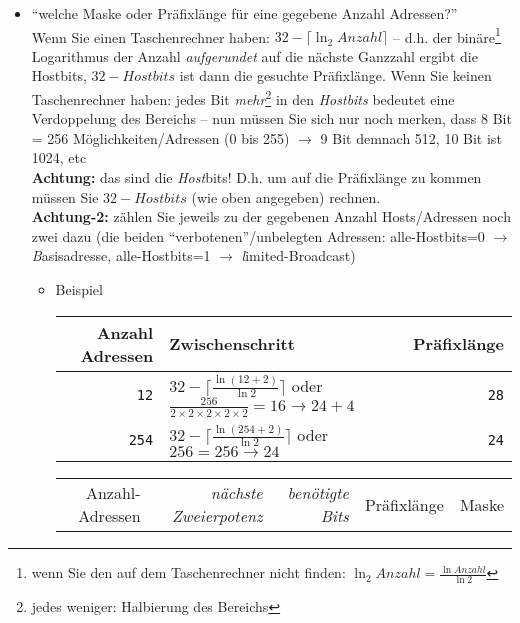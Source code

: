 \documentclass[a4paper,german]{scrartcl}
\begin{document}
\begin{itemize}
\clearpage

%  
   \item ``welche Maske oder Pr\"afixl\"ange f\"ur eine gegebene Anzahl Adressen?''\\
     Wenn Sie einen Taschenrechner haben: $32-\lceil \ln_{2} Anzahl \rceil$ -- d.h. der bin\"are\footnote{wenn Sie den auf dem Taschenrechner nicht finden: $\ln_{2} Anzahl = \frac{\ln Anzahl}{\ln 2}$} Logarithmus der Anzahl \emph{aufgerundet} auf die n\"achste Ganzzahl ergibt die Hostbits, $32-Hostbits$ ist dann die gesuchte Pr\"afixl\"ange. Wenn Sie keinen Taschenrechner haben: jedes Bit \emph{mehr}\footnote{jedes weniger: Halbierung des Bereichs} in den \emph{Hostbits} bedeutet eine Verdoppelung des Bereichs -- nun m\"ussen Sie sich nur noch merken, dass 8 Bit = 256 M\"oglichkeiten/Adressen (0 bis 255) $\rightarrow$ 9 Bit demnach 512, 10 Bit ist 1024, etc\\
     {\bfseries Achtung:} das sind die \emph{Host}bits! D.h. um auf die Pr\"afixl\"ange zu kommen m\"ussen Sie $32-Hostbits$ (wie oben angegeben) rechnen.\\
     {\bfseries Achtung-2:} z\"ahlen Sie jeweils zu der gegebenen Anzahl Hosts/Adressen noch zwei dazu (die beiden ``verbotenen''/unbelegten Adressen: alle-Hostbits=0 $\rightarrow$ {\emph Basisadresse}, alle-Hostbits=1 $\rightarrow$ {\emph limited-Broadcast})
 \vspace{0.25cm}
   \begin{itemize}
     \item Beispiel\\
       \begin{small}
         \begin{tabular}{rlr}
           Anzahl Adressen & Zwischenschritt & Pr\"afixl\"ange \\
           \hline
           \texttt{12} & $32-\lceil \frac{\ln (12+2)}{\ln 2} \rceil$ oder $\frac{256}{2 \times 2 \times 2 \times 2 \times 2}=16 \rightarrow 24+4$ & \texttt{28} \\
           \texttt{254} & $32-\lceil \frac{\ln (254+2)}{\ln 2} \rceil$ oder $256=256 \rightarrow 24$ & \texttt{24} \\        \end{tabular}
       \end{small}
       \vspace{0.25cm}
       \begin{center}
         \begin{tabular}{rrrrr}
           Anzahl-Adressen & \emph{n\"achste Zweierpotenz} & \emph{ben\"otigte Bits} & Pr\"afixl\"ange        & Maske \\

\end{tabular}
\end{center}
\end{itemize}
\end{itemize}
\end{document}
